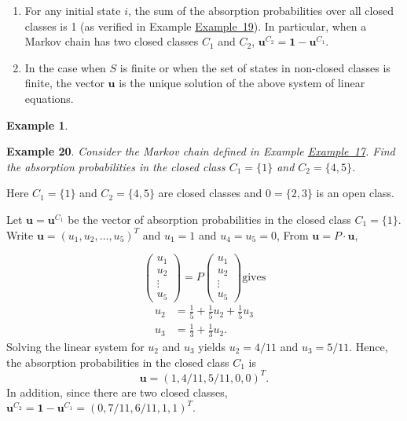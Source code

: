 \documentclass[
]{book}
\theoremstyle{definition}
\theoremstyle{definition}
\newtheorem{example}{Example}[chapter]
\theoremstyle{definition}
\theoremstyle{definition}
\theoremstyle{remark}
\begin{document}
\begin{enumerate}
\def\labelenumi{\arabic{enumi}.}
\item
  For any initial state \(i\), the sum of the absorption probabilities
  over all closed classes is 1 (as verified in Example
  \protect\hyperlink{absorption}{Example~19}). In particular, when a Markov chain has two
  closed classes \(C_1\) and \(C_2\),
  \(\mathbf{u}^{C_2} = \mathbf{1} - \mathbf{u}^{C_1}\).
\item
  In the case when \(S\) is finite or when the set of states in
  non-closed classes is finite, the vector \(\mathbf{u}\) is the unique
  solution of the above system of linear equations.
\end{enumerate}

\begin{example}
\protect\hypertarget{exm:unlabeled-div-24}{}\label{exm:unlabeled-div-24}

\textbf{Example 20}. \emph{Consider the Markov chain defined in Example
\protect\hyperlink{exampleMC}{Example~17}.
Find the absorption probabilities in the closed class \(C_1 = \{1\}\) and
\(C_2 = \{4,5\}\).}

\end{example}

Here \(C_{1}=\{1\}\) and \(C_{2}=\{4,5\}\) are closed classes and
\(0 = \{2,3\}\) is an open class.

Let \(\mathbf{u}=\mathbf{u}^{C_{1}}\) be the vector of absorption
probabilities in the closed class \(C_{1}=\{1\}\). Write
\(\mathbf{u}= (u_1,u_2, \ldots,u_5)^T\) and \(u_1 = 1\) and \(u_4 = u_5 =0\),
From \(\mathbf{u}=P \cdot \mathbf{u}\),

\[\left(\begin{array}{c}u_{1} \\ u_{2} \\ \vdots \\ u_{5}\end{array}\right)=P\left(\begin{array}{c}u_{1} \\ u_{2} \\ \vdots \\ u_{5}\end{array}\right) \text {gives}\]
\[\begin{aligned}
    u_2 &= \frac{1}{5} + \frac{1}{5} u_2 + \frac{1}{5} u_3 \\
    u_3 &= \frac{1}{3} + \frac{1}{3} u_2.   \end{aligned}\] Solving the
linear system for \(u_2\) and \(u_3\) yields \(u_2 = 4/11\) and \(u_3 = 5/11\).
Hence, the absorption probabilities in the closed class \(C_1\) is
\[\mathbf{u}= (1,4/11,5/11,0,0)^T.\] In addition, since there are two
closed classes,
\(\mathbf{u}^{C_2} = \mathbf{1} - \mathbf{u}^{C_1} = (0,7/11,6/11,1,1)^T.\)
\end{document}
